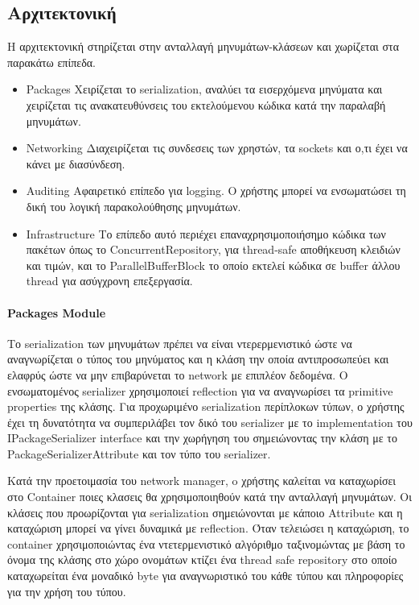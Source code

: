 \documentclass[oneside, 12pt]{book}
\begin{document}
		\subsection{Αρχιτεκτονική}	
		Η αρχιτεκτονική στηρίζεται στην ανταλλαγή μηνυμάτων-κλάσεων και χωρίζεται στα παρακάτω επίπεδα.
			\begin{itemize}
				\item {Packages} Χειρίζεται το serialization, αναλύει τα εισερχόμενα μηνύματα και χειρίζεται τις ανακατευθύνσεις του εκτελούμενου κώδικα κατά την παραλαβή μηνυμάτων. 
				\item {Networking} Διαχειρίζεται τις συνδεσεις των χρηστών, τα sockets και ο,τι έχει να κάνει με διασύνδεση.
				\item {Auditing} Αφαιρετικό επίπεδο για logging. Ο χρήστης μπορεί να ενσωματώσει τη δική του λογική παρακολούθησης μηνυμάτων.
				\item{Infrastructure} Το επίπεδο αυτό περιέχει επαναχρησιμοποιήσημο κώδικα των πακέτων όπως το ConcurrentRepository, για thread-safe αποθήκευση κλειδιών και τιμών, και το ParallelBufferBlock το οποίο εκτελεί κώδικα σε buffer άλλου thread για ασύγχρονη επεξεργασία.
			\end{itemize}
			
			\paragraph{Packages Module}	 
			Το serialization των μηνυμάτων πρέπει να είναι ντερερμενιστικό ώστε να αναγνωρίζεται ο τύπος του μηνύματος και η κλάση την οποία αντιπροσωπεύει και ελαφρύς ώστε να μην επιβαρύνεται το network με επιπλέον δεδομένα. Ο ενσωματομένος serializer χρησιμοποιεί reflection για να αναγνωρίσει τα primitive properties της κλάσης. Για προχωριμένο serialization περίπλοκων τύπων, ο χρήστης έχει τη δυνατότητα να συμπεριλάβει τον δικό του serializer με το implementation του IPackageSerializer interface και την χωρήγηση του σημειώνοντας την κλάση με το PackageSerializerAttribute και τον τύπο του serializer.
			
			
			Κατά την προετοιμασία του network manager, o χρήστης καλείται να καταχωρίσει στο Container ποιες κλασεις θα χρησιμοποιηθούν κατά την ανταλλαγή μηνυμάτων. Οι κλάσεις που προωρίζονται για serialization σημειώνονται με κάποιο Attribute και η καταχώριση μπορεί να γίνει δυναμικά με reflection.
			Όταν τελειώσει η καταχώριση, το container χρησιμοποιώντας ένα ντετερμενιστικό αλγόριθμο ταξινομώντας με βάση το όνομα της κλάσης στο χώρο ονομάτων κτίζει ένα thread safe repository στο οποίο καταχωρείται ένα μοναδικό byte για αναγνωριστικό του κάθε τύπου και πληροφορίες για την χρήση του τύπου.
			
\end{document}
